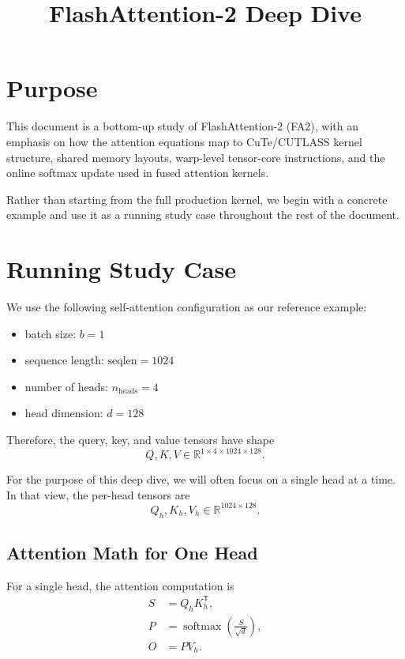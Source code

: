 \documentclass[11pt]{article}
\title{FlashAttention-2 Deep Dive}
\author{}
\date{}
\newcommand{\R}{\mathbb{R}}
\newcommand{\softmax}{\operatorname{softmax}}
\newcommand{\trans}{\mathsf{T}}
\begin{document}
\maketitle

\section{Purpose}

This document is a bottom-up study of FlashAttention-2 (FA2), with an emphasis
on how the attention equations map to CuTe/CUTLASS kernel structure, shared
memory layouts, warp-level tensor-core instructions, and the online softmax
update used in fused attention kernels.

Rather than starting from the full production kernel, we begin with a concrete
example and use it as a running study case throughout the rest of the document.

\section{Running Study Case}

We use the following self-attention configuration as our reference example:

\begin{itemize}
    \item batch size: $b = 1$
    \item sequence length: $\mathrm{seqlen} = 1024$
    \item number of heads: $n_{\mathrm{heads}} = 4$
    \item head dimension: $d = 128$
\end{itemize}

Therefore, the query, key, and value tensors have shape
\[
Q, K, V \in \R^{1 \times 4 \times 1024 \times 128}.
\]

For the purpose of this deep dive, we will often focus on a single head at a
time. In that view, the per-head tensors are
\[
Q_h, K_h, V_h \in \R^{1024 \times 128}.
\]

\subsection{Attention Math for One Head}

For a single head, the attention computation is
\begin{align}
S &= Q_h K_h^\trans, \\
P &= \softmax\!\left(\frac{S}{\sqrt{d}}\right), \\
O &= P V_h.
\end{align}
\end{document}
